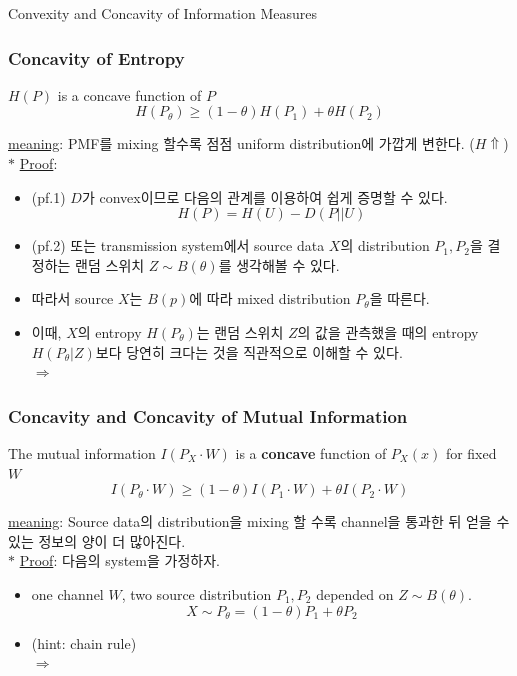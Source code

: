 \documentclass[9pt]{beamer}
\begin{document}
\begin{section}{Convexity and Concavity of Information Measures}
        \begin{frame}
            \frametitle{Concavity of Entropy}
            \begin{corollary}
                $H(P)$ is a concave function of $P$
                $$H(P_{\theta}) \ge (1-\theta)  H(P_1) + \theta H(P_2)$$
            \end{corollary}
            \checkmark \underline{meaning}: PMF를 mixing 할수록 점점 uniform distribution에 가깝게 변한다. ($H \Uparrow$)
            \vspace{0.2cm}
            \\ $\ast$ \underline{Proof}: 
            \begin{itemize}
                \item (pf.1) $D$가 convex이므로 다음의 관계를 이용하여 쉽게 증명할 수 있다.
                $$H(P) = H(U) - D(P||U)$$
                \item (pf.2) 또는 transmission system에서 source data $X$의 distribution $P_1, P_2$을 결정하는 랜덤 스위치 $Z \sim B(\theta)$를 생각해볼 수 있다.
                \item 따라서 source $X$는 $B(p)$에 따라 mixed distribution $P_\theta$을 따른다.
                \item 이때, $X$의 entropy $H(P_\theta)$는 랜덤 스위치 $Z$의 값을 관측했을 때의 entropy $H(P_\theta|Z)$보다 당연히 크다는 것을 직관적으로 이해할 수 있다.
                \\$\Rightarrow$
                \vspace{1.3cm}
            \end{itemize}
        \end{frame}

        \begin{frame}
            \frametitle{Concavity and Concavity of Mutual Information}
            \begin{corollary}
                The mutual information $I(P_X \cdot W)$ is a \textbf{concave} function of $P_X(x)$ for fixed $W$
                $$ I(P_\theta \cdot W) \ge (1-\theta) I (P_1 \cdot W) + \theta I(P_2 \cdot W)$$
            \end{corollary}
            \checkmark \underline{meaning}: Source data의 distribution을 mixing 할 수록 channel을 통과한 뒤 얻을 수 있는 정보의 양이 더 많아진다.
            \vspace{0.2cm}
            \\ $\ast$ \underline{Proof}: 다음의 system을 가정하자.
            \begin{itemize}
                \item one channel $W$, two source distribution $P_1, P_2$ depended on $Z \sim B(\theta)$.
                $$ X \sim P_{\theta} = (1-\theta)P_1 + \theta P_2$$
                \item (hint: chain rule)
                \\ $\Rightarrow$
            \end{itemize}
            \vspace{4cm}
        \end{frame}


\end{section}
\end{document}
